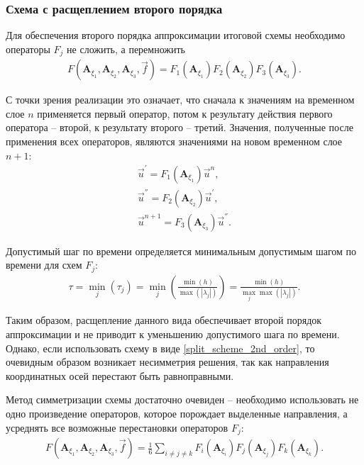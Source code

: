 \subsubsection{Схема с расщеплением второго порядка}

Для обеспечения второго порядка аппроксимации итоговой схемы необходимо операторы $F_j$ не сложить, а перемножить
\begin{eqnarray}
\label{split_scheme_2nd_order}
F(\mathbf A_{\xi_1}, \mathbf A_{\xi_2}, \mathbf A_{\xi_3}, \vec f) = F_1(\mathbf A_{\xi_1}) F_2(\mathbf A_{\xi_2}) F_3(\mathbf A_{\xi_3}).
\end{eqnarray}

С точки зрения реализации это означает, что сначала к значениям на временном слое $n$ применяется первый оператор, потом к результату действия первого оператора -- второй, к результату второго -- третий. Значения, полученные после применения всех операторов, являются значениями на новом временном слое $n+1$:
\begin{eqnarray}
\vec u^{'} = F_1(\mathbf A_{\xi_1}) \vec u^n, \nonumber\\
\vec u^{''} = F_2(\mathbf A_{\xi_2}) \vec u^{'}, \nonumber\\
\vec u^{n+1} = F_3(\mathbf A_{\xi_3}) \vec u^{''}.
\end{eqnarray}

Допустимый шаг по времени определяется минимальным допустимым шагом по времени для схем $F_j$:
\begin{eqnarray}
\tau = \min\limits_{j}(\tau_j) = \min\limits_{j}(\frac{\min(h)}{\max(|\lambda_j|)}) = \frac{\min(h)}{\max\limits_{j}\max(|\lambda_j|)}.
\end{eqnarray}

Таким образом, расщепление данного вида обеспечивает второй порядок аппроксимации и не приводит к уменьшению допустимого шага по времени. Однако, если использовать схему в виде \ref{split_scheme_2nd_order}, то очевидным образом возникает несимметрия решения, так как направления координатных осей перестают быть равноправными.

Метод симметризации схемы достаточно очевиден -- необходимо использовать не одно произведение операторов, которое порождает выделенные направления, а усреднять все возможные перестановки операторов $F_j$:
\begin{eqnarray}
\label{split_scheme_2nd_order_sym}
F(\mathbf A_{\xi_1}, \mathbf A_{\xi_2}, \mathbf A_{\xi_3}, \vec f) = \frac{1}{6} \sum\limits_{i \ne j \ne k} F_i(\mathbf A_{\xi_i}) F_j(\mathbf A_{\xi_j}) F_k(\mathbf A_{\xi_k}).
\end{eqnarray}

